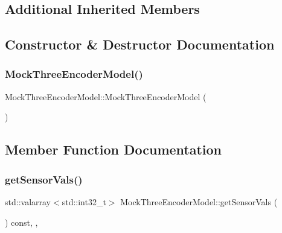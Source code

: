 \subsection*{Additional Inherited Members}


\subsection{Constructor \& Destructor Documentation}
\mbox{\label{classMockThreeEncoderModel_aeb3abc5679f106eb7ec8cab93ac9a0d6}} 
\subsubsection{\texorpdfstring{MockThreeEncoderModel()}{MockThreeEncoderModel()}}
{\footnotesize\ttfamily Mock\+Three\+Encoder\+Model\+::\+Mock\+Three\+Encoder\+Model (\begin{DoxyParamCaption}{ }\end{DoxyParamCaption})\hspace{0.3cm}{\ttfamily [inline]}}



\subsection{Member Function Documentation}
\mbox{\label{classMockThreeEncoderModel_abfb68ba00f387d3374c979eb4b136e33}} 
\subsubsection{\texorpdfstring{getSensorVals()}{getSensorVals()}}
{\footnotesize\ttfamily std\+::valarray$<$std\+::int32\+\_\+t$>$ Mock\+Three\+Encoder\+Model\+::get\+Sensor\+Vals (\begin{DoxyParamCaption}{ }\end{DoxyParamCaption}) const\hspace{0.3cm}{\ttfamily [inline]}, {\ttfamily [override]}, {\ttfamily [virtual]}}



